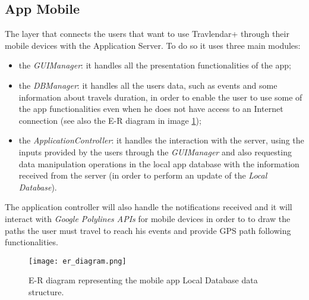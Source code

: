 \subsection{App Mobile}
\label{subsect:App Mobile}
	The layer that connects the users that want to use Travlendar+ through their mobile devices with the Application Server.
	To do so it uses three main modules: 
	\begin{itemize}
	\item the \textit{GUIManager}: it handles all the presentation functionalities of the app;
	\item the \textit{DBManager}: it handles all the users data, such as events and some information about travels duration, in order to enable the user to use some of the app functionalities even when he does not have access to an Internet connection (see also the E-R diagram in image \ref{fig:localDB});
	\item the \textit{ApplicationController}: it handles the interaction with the server, using the inputs provided by the users through the \textit{GUIManager} and also requesting data manipulation operations in the local app database with the information received from the server (in order to perform an update of the \textit{Local Database}).
	\end{itemize}
	The application controller will also handle the notifications received and it will interact with \textit{Google Polylines APIs} for mobile devices in order to to draw the paths the user must travel to reach his events and provide GPS path following functionalities.
\begin{figure} [H]
	\begin{center}
		\hspace*{-10pt}
		\texttt{[image: er\_diagram.png]}
	\end{center}
	\caption{E-R diagram representing the mobile app Local Database data structure.}
	\label{fig:localDB}
\end{figure}
\newpage